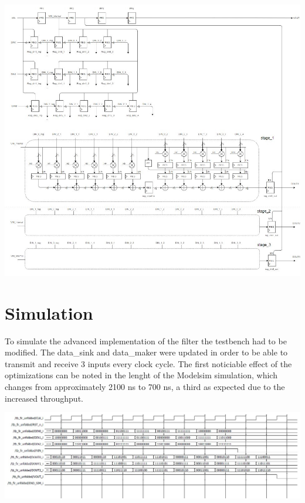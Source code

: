 \vspace{10mm}
\centerline{
\includegraphics[width=15.5cm]{./chapters/figures/fir_adv_2.jpg}}

\vspace{5mm}

\section{Simulation}

To simulate the advanced implementation of the filter the testbench had to be modified. 
The data\_sink and data\_maker were updated in order to be able to transmit and receive 3 inputs every clock cycle.
The first noticiable effect of the optimizations can be noted in the lenght of the Modelsim simulation, which changes from
approximately 2100 ns to 700 ns, a third as expected due to the increased throughput.

\vspace{5mm}
\centerline{
\includegraphics[width=15.5cm]{./chapters/figures/waveform2.jpg}}

